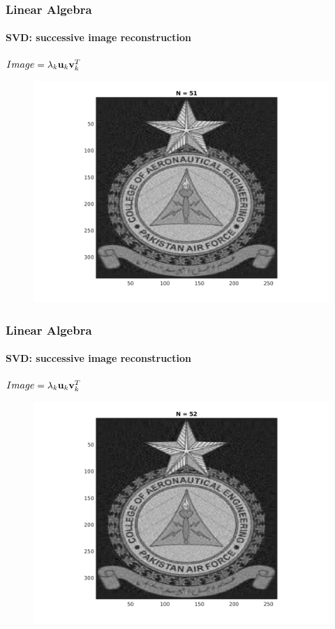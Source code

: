 \documentclass[hyperref={pdfpagelabels=true}]{beamer}
\begin{document}
\begin{frame}
\frametitle{Linear Algebra}
\framesubtitle{SVD: successive image reconstruction} 
\small{
\begin{center}
$Image = \lambda_k{\bf u}_k {\bf v}_k^T$
\end{center}}
\begin{figure}[!htb]
\centering
\includegraphics [scale=0.48]{n/b51.png}
\end{figure}
\end{frame}

\begin{frame}
\frametitle{Linear Algebra}
\framesubtitle{SVD: successive image reconstruction} 
\small{
\begin{center}
$Image = \lambda_k{\bf u}_k {\bf v}_k^T$
\end{center}}
\begin{figure}[!htb]
\centering
\includegraphics [scale=0.48]{n/b52.png}
\end{figure}
\end{frame}
\end{document}
